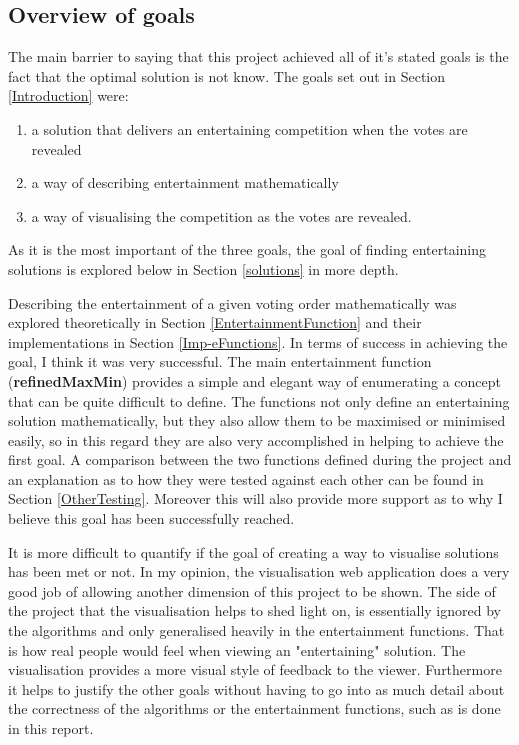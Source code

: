 \documentclass[12pt]{report}
\begin{document}
\subsection{Overview of goals}
The main barrier to saying that this project achieved all of it's stated goals is the fact that the optimal solution is not know. The goals set out in Section \ref{Introduction} were:
\begin{enumerate}
\item a solution that delivers an entertaining competition when the votes are revealed
\item a way of describing entertainment mathematically
\item a way of visualising the competition as the votes are revealed.
\end{enumerate}

As it is the most important of the three goals, the goal of finding entertaining solutions is explored below in Section \ref{solutions} in more depth.

Describing the entertainment of a given voting order mathematically was explored theoretically in Section \ref{EntertainmentFunction} and their implementations in Section \ref{Imp-eFunctions}. In terms of success in achieving the goal, I think it was very successful. The main entertainment function (\textbf{refinedMaxMin}) provides a simple and elegant way of enumerating a concept that can be quite difficult to define. The functions not only define an entertaining solution mathematically, but they also allow them to be maximised or minimised easily, so in this regard they are also very accomplished in helping to achieve the first goal. A comparison between the two functions defined during the project and an explanation as to how they were tested against each other can be found in Section \ref{OtherTesting}. Moreover this will also provide more support as to why I believe this goal has been successfully reached.

It is more difficult to quantify if the goal of creating a way to visualise solutions has been met or not. In my opinion, the visualisation web application does a very good job of allowing another dimension of this project to be shown. The side of the project that the visualisation helps to shed light on, is essentially ignored by the algorithms and only generalised heavily in the entertainment functions. That is how real people would feel when viewing an "entertaining" solution. The visualisation provides a more visual style of feedback to the viewer. Furthermore it helps to justify the other goals without having to go into as much detail about the correctness of the algorithms or the entertainment functions, such as is done in this report.
\end{document}
